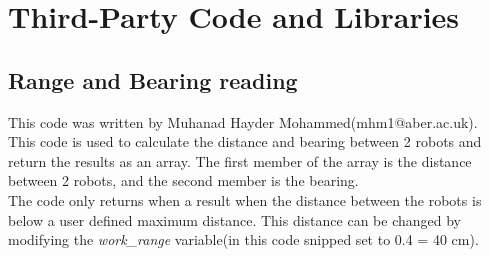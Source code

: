 \chapter{Third-Party Code and Libraries}

\section{Range and Bearing reading}
\label{code:erandB}
This code was written by Muhanad Hayder Mohammed(mhm1@aber.ac.uk).\\
This code is used to calculate the distance and bearing between 2 robots and return the results as an array. The first member of the array is the distance between 2 robots, and the second member is the bearing. \\
The code only returns when a result when the distance between the robots is below a user defined maximum distance. This distance can be changed by modifying the \textit{work\_range} variable(in this code snipped set to 0.4 = 40 cm).
